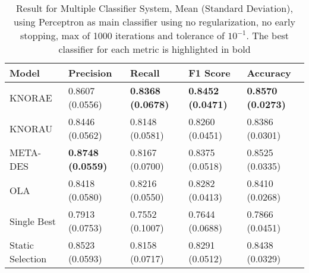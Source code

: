 \begin{table}[h!]
    \centering
    \renewcommand{\arraystretch}{1.8}
    \begin{tabular}{ p{3cm}p{2.8cm}p{2.8cm}p{2.8cm}p{2.8cm} }
        \toprule
        Model & Precision & Recall & F1 Score & Accuracy \\
        \midrule
        KNORAE &            0.8607 (0.0556) & \textbf{0.8368 (0.0678)} & \textbf{0.8452 (0.0471)} & \textbf{0.8570 (0.0273)} \\
        KNORAU &            0.8446 (0.0562) & 0.8148 (0.0581) & 0.8260 (0.0451) & 0.8386 (0.0301) \\
        META-DES &          \textbf{0.8748 (0.0559)} & 0.8167 (0.0700) & 0.8375 (0.0518) & 0.8525 (0.0335) \\
        OLA &               0.8418 (0.0580) & 0.8216 (0.0550) & 0.8282 (0.0413) & 0.8410 (0.0268) \\
        Single Best &       0.7913 (0.0753) & 0.7552 (0.1007) & 0.7644 (0.0688) & 0.7866 (0.0451) \\
        Static Selection &  0.8523 (0.0593) & 0.8158 (0.0717) & 0.8291 (0.0512) & 0.8438 (0.0329) \\ [1ex]
        \bottomrule
        \end{tabular}
        \caption{%
        Result for Multiple Classifier System, Mean (Standard Deviation), using Perceptron as main classifier using no regularization, no early stopping, max of 1000 iterations and tolerance of $10^{-1}$. The best classifier for each metric is highlighted in bold%
        }\label{mcs_perceptron_table}
\end{table}